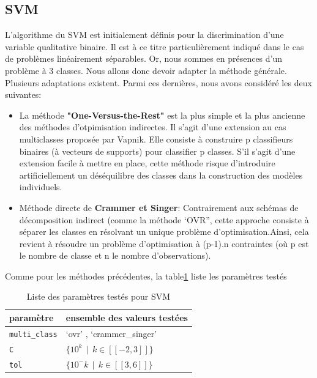 \documentclass[a4paper]{report}
\begin{document}
\subsection{SVM}
L’algorithme du SVM est initialement définis pour la discrimination d’une variable qualitative binaire. Il est à ce titre particulièrement indiqué dans le cas de problèmes linéairement séparables. Or, nous sommes en présences d’un problème à 3 classes. Nous allons donc devoir adapter la méthode générale. Plusieurs adaptations existent. Parmi ces dernières, nous avons considéré les deux suivantes:

\begin{itemize}

\item La méthode \textbf{"One-Versus-the-Rest"} est la plus simple et la plus ancienne des méthodes d'otpimisation indirectes. Il s'agit d'une extension au cas multiclasses proposée par Vapnik\cite{Vapnik}. Elle consiste à construire p classifieurs binaires (à vecteurs de supports) pour classifier p classes. S’il s’agit d’une extension facile à mettre en place, cette méthode risque d’introduire artificiellement un déséquilibre des classes dans la construction des modèles individuels. \\


\medskip
\item Méthode directe de \textbf{Crammer et Singer}\cite{Crammer}: Contrairement aux schémas de décomposition indirect (comme la méthode ‘OVR”, cette approche consiste à séparer les classes en résolvant un unique problème d’optimisation.Ainsi, cela revient à résoudre un problème d’optimisation à (p-1).n contraintes (où p est le nombre de classe et n le nombre d’observations).
\end{itemize}

\bigskip
Comme pour les méthodes précédentes, la table\ref{params_svm} liste les paramètres testés

\begin{table}[h]
\centering
\begin{tabular}{ll}
paramètre & ensemble des valeurs testées \\
\hline

\texttt{multi\_class} & ‘ovr’ , ‘crammer\_singer’ \\
\texttt{C} & $\{10^k \>\> | \>\> k \in [\![-2, 3]\!] \}$ \\
\texttt{tol} & $\{10^-k \>\> | \>\> k \in [\![3, 6]\!] \}$ \\
\end{tabular}

\caption{Liste des paramètres testés pour SVM\label{params_svm}}
\end{table}
\end{document}
